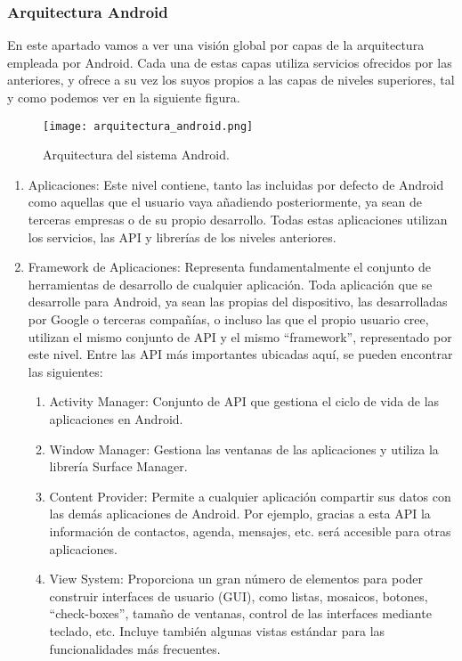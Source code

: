 	\subsubsection{Arquitectura Android}
En este apartado vamos a ver una visión global por capas de la
 arquitectura empleada por Android. Cada una de estas capas utiliza
 servicios ofrecidos por las anteriores, y ofrece a su vez los suyos 
propios a las capas de niveles superiores, tal y como podemos ver
 en la siguiente figura.
\begin{figure}[h]
\texttt{[image: arquitectura\_android.png]} 
\caption{Arquitectura del sistema Android.}
\end{figure}


\begin{enumerate}
\item	Aplicaciones: Este nivel contiene, tanto las incluidas por defecto 
de Android como aquellas que el usuario vaya añadiendo posteriormente,
 ya sean de terceras empresas o de su propio desarrollo. 
Todas estas aplicaciones utilizan los servicios, las API y
 librerías de los niveles anteriores. 
\item	Framework de Aplicaciones: Representa fundamentalmente el
 conjunto de herramientas de desarrollo de cualquier aplicación. 
Toda aplicación que se desarrolle para Android, ya sean las propias 
del dispositivo, las desarrolladas por Google o terceras compañías,
 o incluso las que el propio usuario cree, utilizan el mismo conjunto
 de API y el mismo ``framework'', representado por este nivel. 
Entre las API más importantes ubicadas aquí, se pueden encontrar las siguientes:
\begin{enumerate}
\item	Activity Manager: Conjunto de API que gestiona el ciclo de vida de
 las aplicaciones en Android.
\item	Window Manager: Gestiona las ventanas de las aplicaciones y
 utiliza la librería Surface Manager.
\item	Content Provider: Permite a cualquier aplicación compartir sus
 datos con las demás aplicaciones de Android. Por ejemplo, gracias a 
esta API la información de contactos, agenda, mensajes, etc. 
será accesible para otras aplicaciones.
\item	View System: Proporciona un gran número de elementos para poder
 construir interfaces de usuario (GUI), como listas, mosaicos, 
botones, ``check-boxes'', tamaño de ventanas, control de las
 interfaces mediante teclado, etc. Incluye también algunas vistas
 estándar para las funcionalidades más frecuentes.

\end{enumerate}
\end{enumerate}
